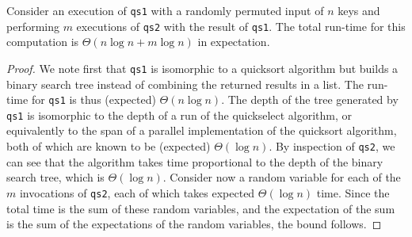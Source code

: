 \begin{abstrsyn}
\begin{theorem*}
  Consider an execution of \texttt{qs1} with a randomly permuted input
  of $n$ keys and performing $m$ executions of \texttt{qs2} with the
  result of \texttt{qs1}.  The total run-time for this computation is
  $\Theta(n\log{n} + m\log{n})$ in expectation.
\end{theorem*}
\begin{proof}
  We note first that \texttt{qs1} is
  isomorphic to a quicksort algorithm but builds a binary search tree
  instead of combining the returned results in a list.  The run-time
  for \texttt{qs1} is thus (expected) $\Theta(n\log{n})$.
%
  The depth of the tree generated by \texttt{qs1} is isomorphic to the
    depth of a run of the quickselect algorithm, or equivalently to the
    span of a parallel implementation of the quicksort algorithm, both
    of which are known to be (expected) $\Theta(\log{n})$.
%
    By inspection of \texttt{qs2}, we can see that the algorithm takes
    time proportional to the depth of the binary search tree, which is
    $\Theta(\log{n})$. Consider now a random variable for each of the
    $m$ invocations of \texttt{qs2}, each of which takes expected
    $\Theta(\log{n})$ time.  Since the total time is the sum of these
    random variables, and the expectation of the sum is the sum of
    the expectations of the random variables, the bound follows.
\end{proof}

\end{abstrsyn}
